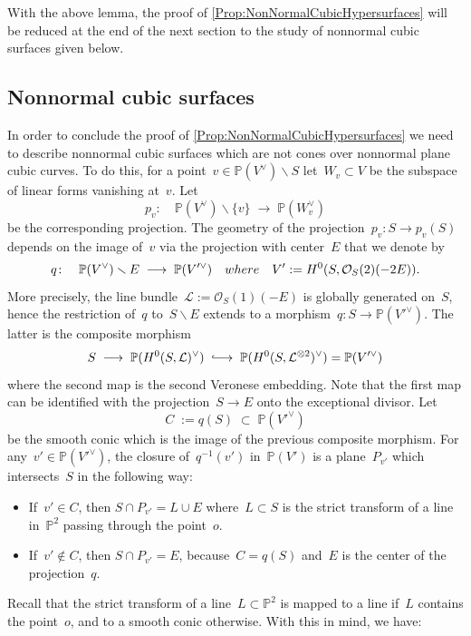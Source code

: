 \documentclass[a4paper]{amsart}
\newcommand{\bbP}{\mathbb{P}}
\newcommand{\cL}{\mathcal{L}}
\newcommand{\cO}{\mathcal{O}}
\newcommand{\rH}{\textup{H}}
\newcommand{\too}{\longrightarrow}
\newcommand{\intoo}{\lhook\joinrel\longrightarrow}
\theoremstyle{plain}
\theoremstyle{definition}
\numberwithin{equation}{section}
\begin{document}
With the above lemma, the proof of \cref{Prop:NonNormalCubicHypersurfaces} will be reduced at the end of the next section to the study of nonnormal cubic surfaces given below.

\subsection{Nonnormal cubic surfaces} \label{sec:NonnormalCubicSurfaces}

In order to conclude the proof of \cref{Prop:NonNormalCubicHypersurfaces} we need to describe nonnormal cubic surfaces which are not cones over nonnormal plane cubic curves. To do this, for a point~$v \in \bbP(V^\vee) \smallsetminus S$ let~$W_v \subset V$ be the subspace of linear forms vanishing at~$v$. Let
\[ p_v \colon \quad \bbP(V^\vee) \smallsetminus \{ v \} \; \too \; \bbP(W_v^\vee)\]
be the corresponding projection. The geometry of the projection~$p_v \colon S \to p_v(S)$ depends on the image of~$v$ via the projection with center~$E$ that we denote by
\[ q \colon \quad \bbP(V^\vee)\smallsetminus E \; \too \; \bbP(V'^\vee) \quad \textup{where} \quad V' := \rH^0(S, \cO_{S}(2)(-2E)).\]
More precisely, the line bundle~$\cL := \cO_{S}(1)(-E)$ is globally generated on~$S$, hence the restriction of~$q$ to~$S \smallsetminus E$ extends to a morphism~$q \colon S \to \bbP(V'^\vee)$. The latter is  the composite morphism
\[ S \; \too \; \bbP(\rH^0(S, \cL)^\vee) \; \intoo \; \bbP(\rH^0(S, \cL^{\otimes 2})^\vee) = \bbP(V'^\vee)\]
where the second map is the second Veronese embedding. Note that the first map can be identified with the projection~$S \to E$ onto the exceptional divisor. Let
\[ C \; := q(S) \;  \subset \; \bbP(V'^\vee)\]
be the smooth conic which is the image of the previous composite morphism. For any~$v' \in \bbP(V'^\vee)$, the closure of~$q^{-1}(v')$ in~$\bbP(V')$ is a plane~$P_{v'}$ which intersects~$S$ in the following way:
\begin{itemize}
\item If~$v' \in C$, then $S \cap P_{v'} = L \cup E$ where~$L \subset S$ is the strict transform of a line in~$\bbP^2$ passing through the point~$o$. \smallskip
\item If~$v' \not \in C$, then $S \cap P_{v'} = E$,  because~$C = q(S)$ and~$E$ is the center of the projection~$q$.
\end{itemize}
Recall that the strict transform of a line~$L \subset \bbP^2$ is mapped to a line if~$L$ contains the point~$o$, and to a smooth conic otherwise. With this in mind, we have:
\end{document}
